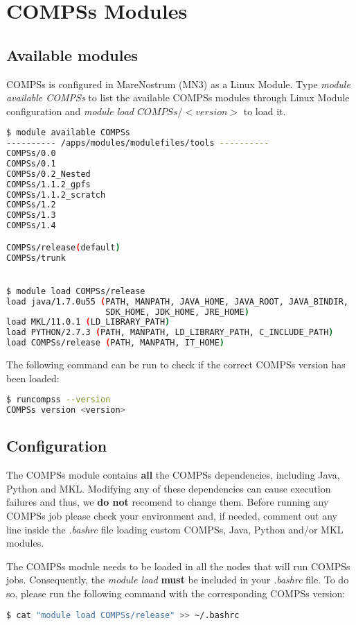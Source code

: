 \section{COMPSs Modules}
\label{sec:Modules}


\subsection{Available modules}
COMPSs is configured in MareNostrum (MN3) as a Linux Module. Type \textit{module available COMPSs} to list the available COMPSs modules 
through Linux Module configuration and \textit{module load $COMPSs/<version>$} to load it.
\begin{lstlisting}[language=bash]
$ module available COMPSs
---------- /apps/modules/modulefiles/tools ----------
COMPSs/0.0                          
COMPSs/0.1
COMPSs/0.2_Nested
COMPSs/1.1.2_gpfs
COMPSs/1.1.2_scratch
COMPSs/1.2 
COMPSs/1.3
COMPSs/1.4

COMPSs/release(default)
COMPSs/trunk


$ module load COMPSs/release
load java/1.7.0u55 (PATH, MANPATH, JAVA_HOME, JAVA_ROOT, JAVA_BINDIR, 
                    SDK_HOME, JDK_HOME, JRE_HOME)
load MKL/11.0.1 (LD_LIBRARY_PATH)
load PYTHON/2.7.3 (PATH, MANPATH, LD_LIBRARY_PATH, C_INCLUDE_PATH)
load COMPSs/release (PATH, MANPATH, IT_HOME)
\end{lstlisting}

The following command can be run to check if the correct COMPSs version has been loaded:
\begin{lstlisting}[language=bash]
$ runcompss --version
COMPSs version <version>

\end{lstlisting}

\subsection{Configuration}
The COMPSs module contains \textbf{all} the COMPSs dependencies, including Java, Python and MKL. Modifying any of these dependencies
can cause execution failures and thus, we \textbf{do not} recomend to change them. Before running any COMPSs job please check your 
environment and, if needed, comment out any line inside the \textit{.bashrc} file loading custom COMPSs, Java, Python and/or MKL
modules.

The COMPSs module needs to be loaded in all the nodes that will run COMPSs jobs. Consequently, the \textit{module load} \textbf{must}
be included in your \textit{.bashrc} file. To do so, please run the following command with the corresponding COMPSs version:
\begin{lstlisting}[language=bash]
$ cat "module load COMPSs/release" >> ~/.bashrc
\end{lstlisting}

